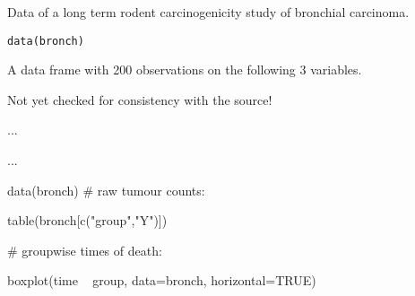 \begin{Description}\relax
Data of a long term rodent carcinogenicity study of bronchial carcinoma.
\end{Description}
\begin{Usage}
\begin{verbatim}data(bronch)\end{verbatim}
\end{Usage}
\begin{Format}\relax
A data frame with 200 observations on the following 3 variables.
\end{Format}
\begin{Details}\relax
Not yet checked for consistency with the source!
\end{Details}
\begin{Source}\relax
...
\end{Source}
\begin{References}\relax
...
\end{References}
\begin{Examples}
\begin{ExampleCode}
data(bronch)
# raw tumour counts:

table(bronch[c("group","Y")])

# groupwise times of death:

boxplot(time ~ group, data=bronch, horizontal=TRUE)

\end{ExampleCode}
\end{Examples}

